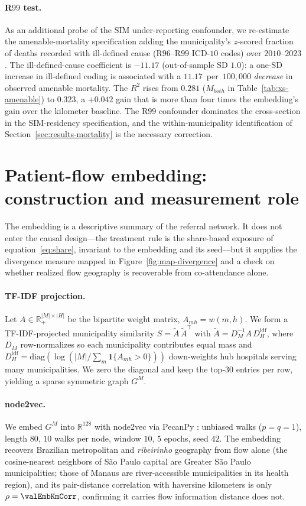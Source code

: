 \paragraph{R$99$ test.} As an additional probe of the SIM
under-reporting confounder, we re-estimate the amenable-mortality
specification adding the municipality's $z$-scored fraction of deaths
recorded with ill-defined cause (R$96$--R$99$ ICD-$10$ codes) over
$2010$--$2023$. The ill-defined-cause coefficient is $-11.17$ (out-of-sample
SD $1.0$): a one-SD increase in ill-defined coding is associated with a
$11.17$~per~$100{,}000$ \emph{decrease} in observed amenable mortality.
The $R^2$ rises from $0.281$ ($M_{both}$ in
Table~\ref{tab:xs-amenable}) to $0.323$, a $+0.042$ gain that is more
than four times the embedding's gain over the kilometer baseline.
The R$99$ confounder dominates the cross-section in the SIM-residency
specification, and the within-municipality identification of
Section~\ref{sec:results-mortality} is the necessary correction.

\section{Patient-flow embedding: construction and measurement role}
\label{app:embedding}

The embedding is a descriptive summary of the referral network. It does
not enter the causal design---the treatment rule is the share-based
exposure of equation~\eqref{eq:share}, invariant to the embedding and its
seed---but it supplies the divergence measure mapped in
Figure~\ref{fig:map-divergence} and a check on whether realized flow
geography is recoverable from co-attendance alone.

\paragraph{TF-IDF projection.} Let $A \in \mathbb{R}_+^{|M| \times |H|}$
be the bipartite weight matrix, $A_{mh} = w(m,h)$. We form a
TF-IDF-projected municipality similarity
$S = \widetilde{A}\,\widetilde{A}^\top$ with
$\widetilde{A} = D_M^{-1} A\, D_H^{\mathrm{idf}}$, where $D_M$
row-normalizes so each municipality contributes equal mass and
$D_H^{\mathrm{idf}} = \mathrm{diag}(\log(|M|/\sum_m \mathbf{1}\{A_{mh}>0\}))$
down-weights hub hospitals serving many municipalities. We zero the
diagonal and keep the top-$30$ entries per row, yielding a sparse
symmetric graph $G^M$.

\paragraph{node2vec.} We embed $G^M$ into $\mathbb{R}^{128}$ with node2vec
\citep{grover2016} via PecanPy \citep{liu2021pecanpy}: unbiased walks
($p=q=1$), length $80$, $10$ walks per node, window $10$, $5$ epochs,
seed $42$. The embedding recovers Brazilian metropolitan and
\emph{ribeirinho} geography from flow alone (the cosine-nearest neighbors
of São Paulo capital are Greater São Paulo municipalities; those of
Manaus are river-accessible municipalities in its health region), and its
pair-distance correlation with haversine kilometers is only
$\rho = \valEmbKmCorr$, confirming it carries flow information distance does not.

